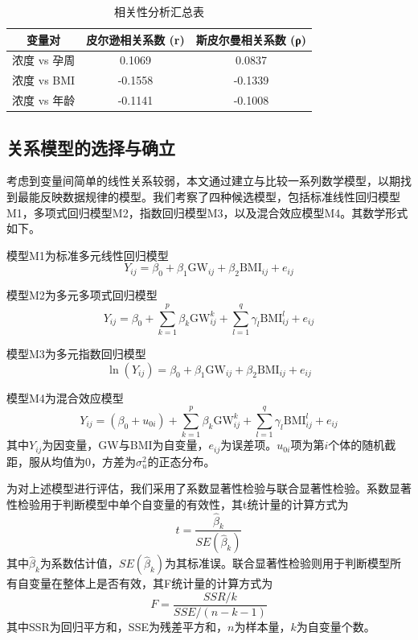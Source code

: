 \begin{table}[h!]
	\centering
	\caption{相关性分析汇总表}
	\label{tab:相关性分析汇总表}
	\begin{tabular}{ccc}
		\hline
		变量对       & 皮尔逊相关系数 (r) & 斯皮尔曼相关系数 (ρ) \\
		\hline
		浓度 vs 孕周  & 0.1069      & 0.0837       \\
		浓度 vs BMI & -0.1558     & -0.1339      \\
		浓度 vs 年龄  & -0.1141     & -0.1008      \\
		\hline
	\end{tabular}
\end{table}

\subsection{关系模型的选择与确立}
考虑到变量间简单的线性关系较弱，本文通过建立与比较一系列数学模型，以期找到最能反映数据规律的模型。我们考察了四种候选模型，包括标准线性回归模型M1，多项式回归模型M2，指数回归模型M3，以及混合效应模型M4。其数学形式如下。

模型M1为标准多元线性回归模型
\begin{equation}
	Y_{ij} = \beta_0 + \beta_1 \text{GW}_{ij} + \beta_2 \text{BMI}_{ij} + e_{ij}
\end{equation}

模型M2为多元多项式回归模型
\begin{equation}
	Y_{ij} = \beta_0 + \sum_{k=1}^p \beta_k \text{GW}_{ij}^k + \sum_{l=1}^q \gamma_l \text{BMI}_{ij}^l + e_{ij}
\end{equation}

模型M3为多元指数回归模型
\begin{equation}
	\ln(Y_{ij}) = \beta_0 + \beta_1 \text{GW}_{ij} + \beta_2 \text{BMI}_{ij} + e_{ij}
\end{equation}

模型M4为混合效应模型
\begin{equation}
	Y_{ij} = (\beta_0 + u_{0i}) + \sum_{k=1}^p \beta_k \text{GW}_{ij}^k + \sum_{l=1}^q \gamma_l \text{BMI}_{ij}^l + e_{ij}
\end{equation}
其中$Y_{ij}$为因变量，GW与BMI为自变量，$e_{ij}$为误差项。$u_{0i}$项为第$i$个体的随机截距，服从均值为0，方差为$\sigma_u^2$的正态分布。

为对上述模型进行评估，我们采用了系数显著性检验与联合显著性检验。系数显著性检验用于判断模型中单个自变量的有效性，其t统计量的计算方式为
\begin{equation}
	t = \frac{\hat{\beta}_k}{SE(\hat{\beta}_k)}
\end{equation}
其中$\hat{\beta}_k$为系数估计值，$SE(\hat{\beta}_k)$为其标准误。联合显著性检验则用于判断模型所有自变量在整体上是否有效，其F统计量的计算方式为
\begin{equation}
	F = \frac{SSR/k}{SSE/(n-k-1)}
\end{equation}
其中SSR为回归平方和，SSE为残差平方和，$n$为样本量，$k$为自变量个数。

